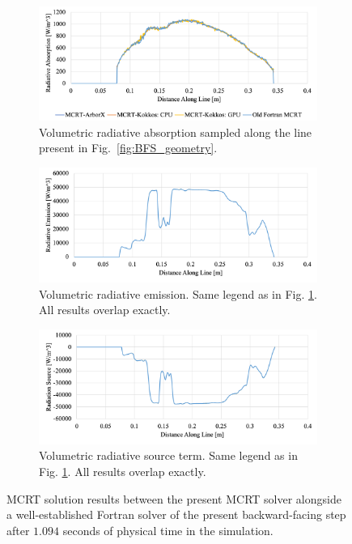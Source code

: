 \begin{figure}
  \begin{subfigure}{1\textwidth}
  \centering
  \includegraphics[width=0.8\linewidth]{figures/ch4/LineComparison_RadAbs.png}
  \caption{Volumetric radiative absorption sampled along the line present in Fig.~\ref{fig:BFS_geometry}.}
  \label{fig:BFS_RadAbs}
  \end{subfigure}
  \begin{subfigure}{1\textwidth}
  \centering
  \includegraphics[width=0.8\linewidth]{figures/ch4/LineComparison_RadEmi.png}
  \caption{Volumetric radiative emission. Same legend as in Fig. \ref{fig:BFS_RadAbs}. All results overlap exactly.}
  \label{fig:BFS_RadEmi}
  \end{subfigure}
  \begin{subfigure}{1\textwidth}
  \centering
  \includegraphics[width=0.8\linewidth]{figures/ch4/LineComparison_RadSrc.png}
  \caption{Volumetric radiative source term. Same legend as in Fig. \ref{fig:BFS_RadAbs}. All results overlap exactly.}
  \label{fig:BFS_RadSrc}
  \end{subfigure}
  \caption{MCRT solution results between the present MCRT solver alongside a well-established Fortran solver of the present backward-facing step after $1.094$ seconds of physical time in the simulation.}
  \label{fig:BFS_contours}
\end{figure}



